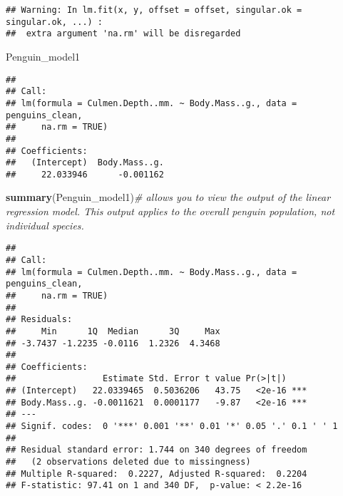 \documentclass[
]{article}
\newenvironment{Shaded}{\begin{snugshade}}{\end{snugshade}}
\newcommand{\CommentTok}[1]{\textcolor[rgb]{0.56,0.35,0.01}{\textit{#1}}}
\newcommand{\FunctionTok}[1]{\textcolor[rgb]{0.13,0.29,0.53}{\textbf{#1}}}
\newcommand{\NormalTok}[1]{#1}
\begin{document}
\begin{verbatim}
## Warning: In lm.fit(x, y, offset = offset, singular.ok = singular.ok, ...) :
##  extra argument 'na.rm' will be disregarded
\end{verbatim}

\begin{Shaded}
\begin{Highlighting}[]
\NormalTok{Penguin\_model1}
\end{Highlighting}
\end{Shaded}

\begin{verbatim}
## 
## Call:
## lm(formula = Culmen.Depth..mm. ~ Body.Mass..g., data = penguins_clean, 
##     na.rm = TRUE)
## 
## Coefficients:
##   (Intercept)  Body.Mass..g.  
##     22.033946      -0.001162
\end{verbatim}

\begin{Shaded}
\begin{Highlighting}[]
\FunctionTok{summary}\NormalTok{(Penguin\_model1)}\CommentTok{\# allows you to view the output of the linear regression model. This output applies to the overall penguin population, not individual species.}
\end{Highlighting}
\end{Shaded}

\begin{verbatim}
## 
## Call:
## lm(formula = Culmen.Depth..mm. ~ Body.Mass..g., data = penguins_clean, 
##     na.rm = TRUE)
## 
## Residuals:
##     Min      1Q  Median      3Q     Max 
## -3.7437 -1.2235 -0.0116  1.2326  4.3468 
## 
## Coefficients:
##                 Estimate Std. Error t value Pr(>|t|)    
## (Intercept)   22.0339465  0.5036206   43.75   <2e-16 ***
## Body.Mass..g. -0.0011621  0.0001177   -9.87   <2e-16 ***
## ---
## Signif. codes:  0 '***' 0.001 '**' 0.01 '*' 0.05 '.' 0.1 ' ' 1
## 
## Residual standard error: 1.744 on 340 degrees of freedom
##   (2 observations deleted due to missingness)
## Multiple R-squared:  0.2227, Adjusted R-squared:  0.2204 
## F-statistic: 97.41 on 1 and 340 DF,  p-value: < 2.2e-16
\end{verbatim}

\begin{Shaded}
\end{Shaded}
\end{document}
